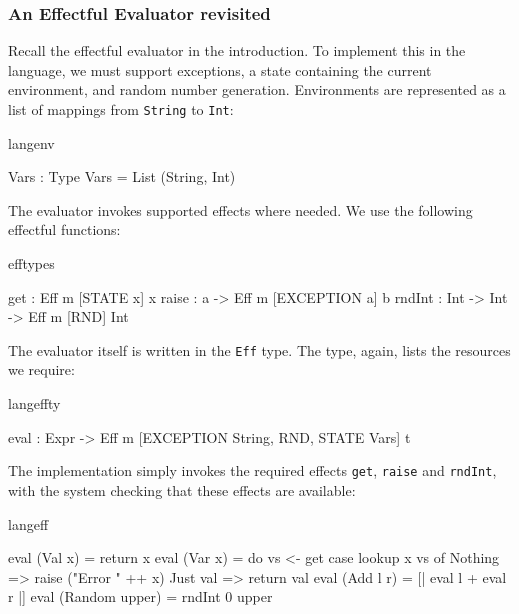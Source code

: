\subsubsection{An Effectful Evaluator revisited}

Recall the effectful evaluator in the introduction. To implement this
in the \Eff{} language, we must support exceptions, a state containing the
current environment, and random number generation. Environments are
represented as a list of mappings from \texttt{String} to \texttt{Int}:

\begin{SaveVerbatim}{langenv}

Vars : Type
Vars = List (String, Int)

\end{SaveVerbatim}

\noindent
The evaluator invokes supported effects where needed. We use the following
effectful functions:

\begin{SaveVerbatim}{efftypes}

get    : Eff m [STATE x] x
raise  : a -> Eff m [EXCEPTION a] b
rndInt : Int -> Int -> Eff m [RND] Int

\end{SaveVerbatim}

\noindent
The evaluator itself is written in the \texttt{Eff} type.
The 
type, again, lists the resources we require:

\begin{SaveVerbatim}{langeffty}

eval : Expr -> 
       Eff m [EXCEPTION String, RND, STATE Vars] t

\end{SaveVerbatim}

\noindent
The implementation simply invokes the required effects \texttt{get},
\texttt{raise} and \texttt{rndInt}, with the \Eff{} system checking that
these effects are available:

\begin{SaveVerbatim}{langeff}

eval (Val x) = return x
eval (Var x) = 
    do vs <- get
       case lookup x vs of
            Nothing => raise ("Error " ++ x)
            Just val => return val
eval (Add l r) = [| eval l + eval r |]
eval (Random upper) = rndInt 0 upper

\end{SaveVerbatim}

